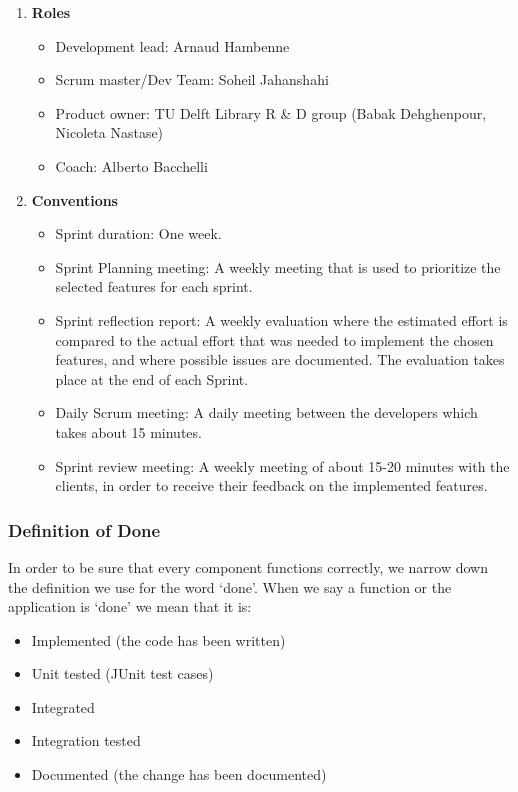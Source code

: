 \begin{enumerate}
	\item \textbf{Roles}
		\begin{itemize}
			\item Development lead: Arnaud Hambenne
			\item Scrum master/Dev Team: Soheil Jahanshahi
			\item Product owner: TU Delft Library R \& D group  (Babak Dehghenpour, Nicoleta Nastase)
			\item Coach: Alberto Bacchelli
		\end{itemize}
	\item \textbf{Conventions}	
\begin{itemize}
		\item Sprint duration: One week.
		\item Sprint Planning meeting: A weekly meeting that is used to prioritize the selected features for each sprint. 
		\item Sprint reflection report: A weekly evaluation where the estimated effort is compared to the actual effort that was needed to implement the chosen features, and where possible issues are documented. The evaluation takes place at the end of each Sprint.
		\item Daily Scrum meeting: A daily meeting between the developers which takes about 15 minutes.
		\item Sprint review meeting: A weekly meeting of about 15-20 minutes with the clients, in order to receive their feedback on the implemented features.
\end{itemize}
\end{enumerate}

\subsubsection{Definition of Done} 
In order to be sure that every component functions correctly, we narrow down the definition we use for the word `done'. When we say a function or the application is `done' we mean that it is: 

\begin{itemize}
	\item	Implemented (the code has been written)
	\item	Unit tested (JUnit test cases)
	\item 	Integrated
	\item 	Integration tested
	\item 	Documented (the change has been documented)
\end{itemize} 



